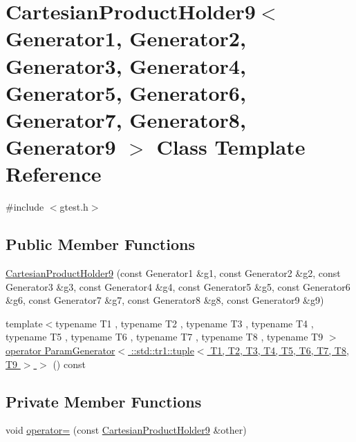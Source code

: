 \hypertarget{classtesting_1_1internal_1_1CartesianProductHolder9}{\section{\-Cartesian\-Product\-Holder9$<$ \-Generator1, \-Generator2, \-Generator3, \-Generator4, \-Generator5, \-Generator6, \-Generator7, \-Generator8, \-Generator9 $>$ \-Class \-Template \-Reference}
\label{de/dd1/classtesting_1_1internal_1_1CartesianProductHolder9}
}


{\ttfamily \#include $<$gtest.\-h$>$}

\subsection*{\-Public \-Member \-Functions}
\begin{DoxyCompactItemize}
\item 
\hyperlink{classtesting_1_1internal_1_1CartesianProductHolder9_a66f97d16e3af8f0653bf1ba9b702ae97}{\-Cartesian\-Product\-Holder9} (const \-Generator1 \&g1, const \-Generator2 \&g2, const \-Generator3 \&g3, const \-Generator4 \&g4, const \-Generator5 \&g5, const \-Generator6 \&g6, const \-Generator7 \&g7, const \-Generator8 \&g8, const \-Generator9 \&g9)
\item 
{\footnotesize template$<$typename T1 , typename T2 , typename T3 , typename T4 , typename T5 , typename T6 , typename T7 , typename T8 , typename T9 $>$ }\\\hyperlink{classtesting_1_1internal_1_1CartesianProductHolder9_aa384ded608cf0c1508849f73bd7b57af}{operator Param\-Generator$<$ \-::std\-::tr1\-::tuple$<$ T1, T2, T3, T4, T5, T6, T7, T8, T9 $>$ $>$} () const 
\end{DoxyCompactItemize}
\subsection*{\-Private \-Member \-Functions}
\begin{DoxyCompactItemize}
\item 
void \hyperlink{classtesting_1_1internal_1_1CartesianProductHolder9_a3b252b471e0f22dd513aad277b4904ed}{operator=} (const \hyperlink{classtesting_1_1internal_1_1CartesianProductHolder9}{\-Cartesian\-Product\-Holder9} \&other)
\end{DoxyCompactItemize}
